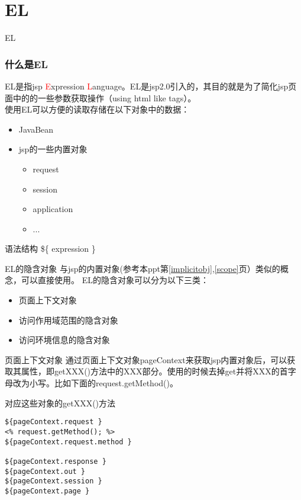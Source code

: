 \documentclass{beamer}
\begin{document}
\section{EL} %
\begin{frame}
\Huge{\centerline{EL}}
\end{frame}
\begin{frame}
\frametitle{什么是EL}
EL是指jsp \textcolor{red}{E}xpression \textcolor{red}{L}anguage。EL是jsp2.0引入的，其目的就是为了简化jsp页面中的的一些参数获取操作（using html like tags）。\\

使用EL可以方便的读取存储在以下对象中的数据：
\begin{itemize}
\item
JavaBean
\item
jsp的一些内置对象
\begin{itemize}
\item
request
\item
session
\item
application
\item
...
\end{itemize}
\end{itemize}
\begin{block}{语法结构}
\$\{ expression \}
\end{block}
\end{frame}
\begin{frame}{EL的隐含对象}
\label{elimplicit}
与jsp的内置对象(参考本ppt第\ref{implicitobj},\ref{scope}页）类似的概念，可以直接使用。
EL的隐含对象可以分为以下三类：
\begin{itemize}
\item
页面上下文对象
\item
访问作用域范围的隐含对象
\item
访问环境信息的隐含对象
\end{itemize}
\end{frame}
\begin{frame}[fragile]{页面上下文对象}
通过页面上下文对象pageContext来获取jsp内置对象后，可以获取其属性，即getXXX()方法中的XXX部分。使用的时候去掉get并将XXX的首字母改为小写。比如下面的request.getMethod()。
\begin{block}{对应这些对象的getXXX()方法}

\begin{lstlisting}
${pageContext.request }
<% request.getMethod(); %>
${pageContext.request.method }

${pageContext.response }
${pageContext.out }
${pageContext.session }
${pageContext.page }

\end{lstlisting}
\end{block}
\end{frame}
\end{document}
